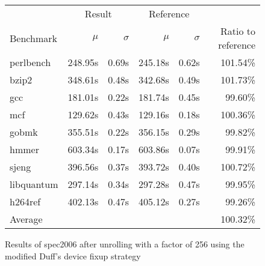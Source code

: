 \begin{figure}[h]
    \begin{center}
        \begin{tabular}{lrrrrr}
            \toprule
            & \multicolumn{2}{c}{Result} & \multicolumn{2}{c}{Reference}\\
            Benchmark & $\mu$ & $\sigma$ & $\mu$ & $\sigma$ & Ratio to reference\\
            \midrule
            perlbench & 248.95s & 0.69s & 245.18s & 0.62s & 101.54\%\\
            bzip2 & 348.61s & 0.48s & 342.68s & 0.49s & 101.73\%\\
            gcc & 181.01s & 0.22s & 181.74s & 0.45s & 99.60\%\\
            mcf & 129.62s & 0.43s & 129.16s & 0.18s & 100.36\%\\
            gobmk & 355.51s & 0.22s & 356.15s & 0.29s & 99.82\%\\
            hmmer & 603.34s & 0.17s & 603.86s & 0.07s & 99.91\%\\
            sjeng & 396.56s & 0.37s & 393.72s & 0.40s & 100.72\%\\
            libquantum & 297.14s & 0.34s & 297.28s & 0.47s & 99.95\%\\
            h264ref & 402.13s & 0.47s & 405.12s & 0.27s & 99.26\%\\
            \midrule
            Average & & & & & 100.32\%\\
            \bottomrule
        \end{tabular}
    \end{center}
    \caption{Results of spec2006 after unrolling with a factor of 256 using the modified Duff's device fixup strategy}
    \label{fig:eval:perf:duff:256}
\end{figure}
